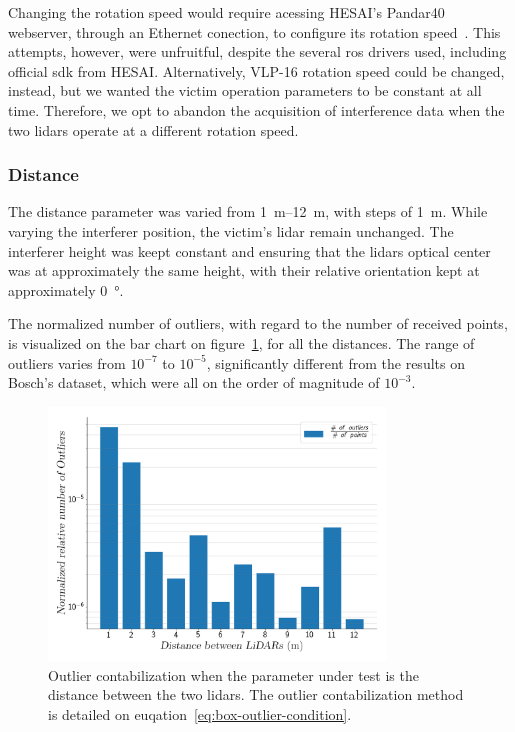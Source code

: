 Changing the rotation speed would require acessing HESAI's Pandar40 webserver, through an Ethernet conection, to configure its rotation speed~\cite{Pandar40UserGuide}. This attempts, however, were unfruitful, despite the several \ac{ros} drivers used, including official \ac{sdk} from HESAI\cp. Alternatively, VLP-16 rotation speed could be changed, instead, but we wanted the victim operation parameters to be constant at all time. Therefore, we opt to abandon the acquisition of interference data when the two \acp{lidar} operate at a different rotation speed.

\subsubsection{Distance}
The distance parameter was varied from \SIrange{1}{12}{\meter}, with steps of \SI{1}{\meter}. While varying the interferer position, the victim's \ac{lidar} remain unchanged. The interferer height was keept constant and ensuring that the \acp{lidar} optical center was at approximately the same height, with their relative orientation kept at approximately \SI{0}{\degree}.

The normalized number of outliers, with regard to the number of received points, is visualized on the bar chart on figure~\ref{fig:box-filter-outliers-distance}, for all the distances. The range of outliers varies from $10^{-7}$ to $10^{-5}$, significantly different from the results on Bosch's dataset, which were all on the order of magnitude of $10^{-3}$.

\begin{figure}[!ht]
	\centering
	\includegraphics[width=0.8\textwidth]{img/lidar-interference/box-filtering/interference-box-filter-outliers-distance.png}
	\caption{Outlier contabilization when the parameter under test is the distance between the two \acp{lidar}. The outlier contabilization method is detailed on euqation~\ref{eq:box-outlier-condition}.}
	\label{fig:box-filter-outliers-distance}
\end{figure}


